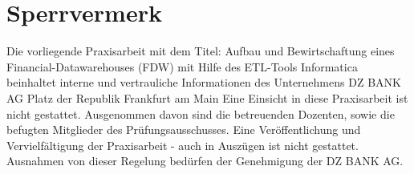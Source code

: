 \chapter*{Sperrvermerk}
Die vorliegende Praxisarbeit mit dem Titel:\newline\newline
\glqq Aufbau und Bewirtschaftung eines Financial-Datawarehouses (FDW) mit Hilfe des ETL-Tools Informatica\grqq\newline\newline
beinhaltet interne und vertrauliche Informationen des Unternehmens\newline\newline
DZ BANK AG\newline
Platz der Republik Frankfurt am Main\newline\newline
Eine Einsicht in diese Praxisarbeit ist nicht gestattet. 
Ausgenommen davon sind die betreuenden Dozenten, sowie die befugten Mitglieder des Prüfungsausschusses. 
Eine Veröffentlichung und Vervielfältigung der Praxisarbeit - auch in Auszügen ist nicht gestattet. 
Ausnahmen von dieser Regelung bedürfen der Genehmigung der DZ BANK AG.